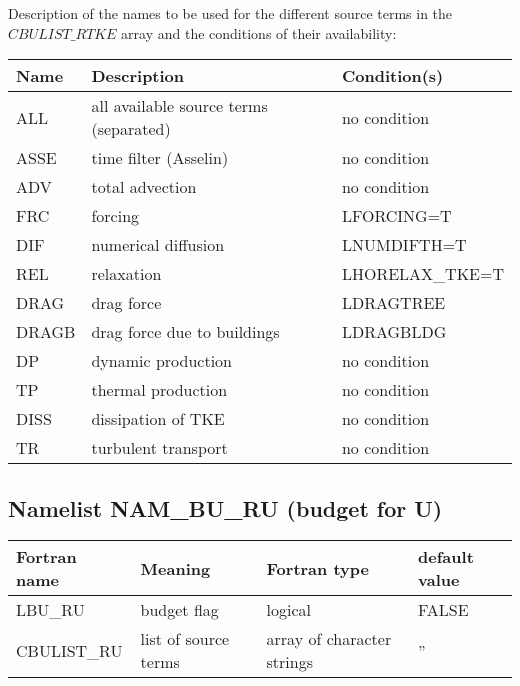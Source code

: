 Description of the names to be used for the different source terms in the $CBULIST\_RTKE$ array and the conditions of their availability:

\begin{longtable} {|p{}|p{}|p{}|}
\hline
Name & Description & Condition(s) \\
\hline \hline
\endhead
ALL    & all available source terms (separated) & no condition \\\hline \hline
ASSE   & time filter (Asselin)        & no condition    \\\hline
ADV    & total advection              & no condition    \\\hline
FRC    & forcing                      & LFORCING=T      \\\hline
DIF    & numerical diffusion          & LNUMDIFTH=T     \\\hline
REL    & relaxation                   & LHORELAX\_TKE=T \\\hline
DRAG   & drag force                   & LDRAGTREE       \\\hline
DRAGB  & drag force due to buildings  & LDRAGBLDG       \\\hline
DP     & dynamic production           & no condition    \\\hline
TP     & thermal production           & no condition    \\\hline
DISS   & dissipation of TKE           & no condition    \\\hline
TR     & turbulent transport          & no condition    \\\hline
\end{longtable}


\subsection{Namelist NAM\_BU\_RU (budget for U)}

\begin{longtable} {|p{}|p{}|>{\centering}p{}|p{}<{\centering}|}
\hline
Fortran name & Meaning & Fortran type & default value \\
\hline \hline
\endhead
LBU\_RU & budget flag & logical & FALSE\index{LBU\_RU!\innam{NAM\_BU\_RU}} \\\hline
CBULIST\_RU & list of source terms & array of character strings & ''\index{CBULIST\_RU!\innam{NAM\_BU\_RU}} \\\hline
\end{longtable}

